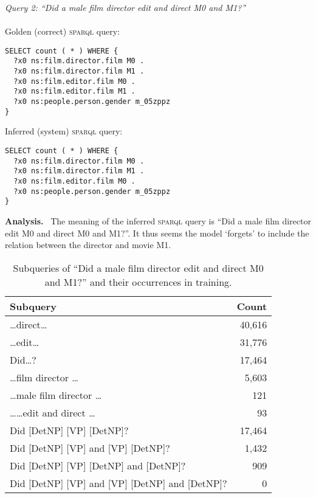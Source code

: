 \documentclass[letterpaper]{article}
\newcommand{\myparagraph}[1]{\textbf{#1}~}
\newcommand{\SPARQL}{\textsc{sparql}}
\begin{document}
\textit{Query 2: ``Did a male film director edit and direct M0 and M1?''}\\\\
Golden (correct) \SPARQL{} query:
\begin{verbatim}
SELECT count ( * ) WHERE {
  ?x0 ns:film.director.film M0 .
  ?x0 ns:film.director.film M1 .
  ?x0 ns:film.editor.film M0 .
  ?x0 ns:film.editor.film M1 .
  ?x0 ns:people.person.gender m_05zppz
}
\end{verbatim}
Inferred (system) \SPARQL{} query:
\begin{verbatim}
SELECT count ( * ) WHERE {
  ?x0 ns:film.director.film M0 .
  ?x0 ns:film.director.film M1 .
  ?x0 ns:film.editor.film M0 .
  ?x0 ns:people.person.gender m_05zppz
}
\end{verbatim}
\myparagraph{Analysis.}
The meaning of the inferred \SPARQL{} query is ``Did a male film director edit M0 and direct M0 and M1?''. It thus seems the model `forgets' to include the relation between the director and movie M1.

\begin{table}[tb]
  \centering
  \begin{tabular}{@{}lr@{}}
\hline
Subquery & Count\\
\hline
\hline
\ldots direct\ldots & 40,616\\
\ldots edit\ldots & 31,776\\
Did\ldots? & 17,464\\
\ldots film director \ldots& 5,603\\
\ldots male film director \ldots& 121\\
\ldots \ldots edit and direct \ldots& 93\\
\hline
Did [DetNP] [VP] [DetNP]? & 17,464\\
Did [DetNP] [VP] and [VP] [DetNP]? & 1,432 \\
Did [DetNP] [VP] [DetNP] and [DetNP]? & 909\\
Did [DetNP] [VP] and [VP] [DetNP] and [DetNP]? & 0\\
\hline
  \end{tabular}
  \caption{Subqueries of ``Did a male film director edit and direct M0 and M1?'' and their occurrences in training.}
  \label{table:qual-analysis:q2}
\end{table}
\end{document}
